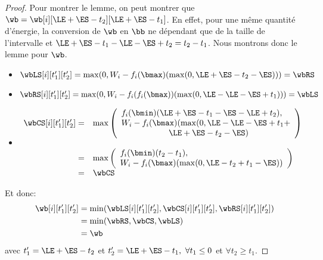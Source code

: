 \begin{proof}
  Pour montrer le lemme, on peut montrer que $ \wb=
  \wb[i][\LE+\ES-t_2][\LE +\ES -t_1]$. En effet, pour une même quantité
  d'énergie, la conversion de $\wb$ en $\bb$ ne dépendant que de la
  taille de l'intervalle et $\LE +\ES -t_1 - \LE - \ES+t_2 =t_2 -
  t_1$. Nous montrons donc le lemme pour $\wb$.

  \begin{itemize}
  \item $\wbLS[i][t_1'][t_2']=\max(0,W_i-f_i(\bmax)(\max(0,\LE+\ES-t_2-\ES)))=\wbRS$
    \vspace{0.2cm}
  \item $\wbRS[i][t_1'][t_2']=\max(0,W_i-f_i(f_i(\bmax))(\max(0,\LE-\LE-\ES+t_1)))=\wbLS$
  \item$
    \begin{array}{rl}
      \wbCS[i][t_1'][t_2']=&\max\left(
                             \begin{array}{l}
                               f_i(\bmin) (\LE+\ES-t_1 - \ES- \LE + t_2),\\
                               W_i - f_i(\bmax)(\max(0,\LE - \LE -\ES +t_1+\\
                               \hspace{2cm}\LE +\ES - t_2 - \ES)
                             \end{array}
      \right)\\
                           & \\
      = &\max\left(
          \begin{array}{l}
            f_i(\bmin) (t_2-t_1),\\
            W_i - f_i(\bmax)(\max(0,\LE-t_2 +t_1 - \ES))
          \end{array}
      \right)\\
      = & \wbCS
    \end{array}$
  \end{itemize}
  Et donc: 
  \begin{align*}
    \wb[i][t_1'][t_2'] &=
                         \min(\wbLS[i][t_1'][t_2'],\wbCS[i][t_1'][t_2'],\wbRS[i][t_1'][t_2'])
    \\
                       & =\min(\wbRS,\wbCS,\wbLS)\\
                       & =\wb 
  \end{align*}
  avec $t_1'=\LE+\ES-t_2$ et
  $t_2'=\LE+\ES-t_1,\ \forall t_1 \le 0$ et $\forall t_2 \ge t_1$.
\end{proof}

